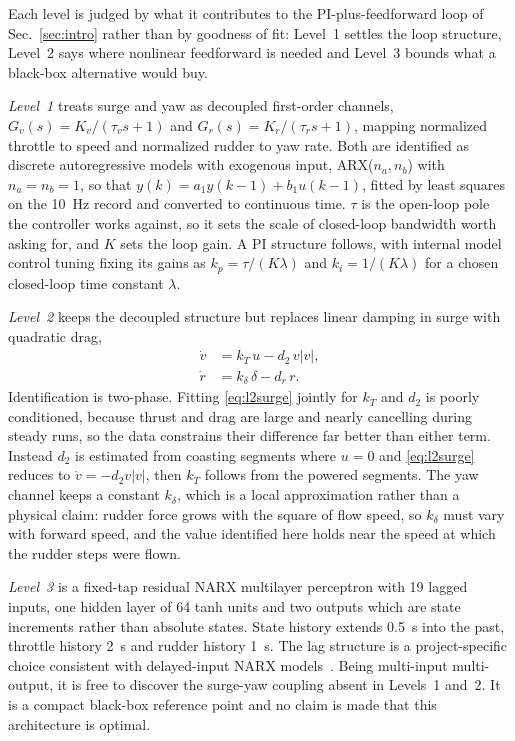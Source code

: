 \documentclass[conference]{IEEEtran}
\begin{document}
Each level is judged by what it contributes to the PI-plus-feedforward loop of Sec.~\ref{sec:intro} rather than by goodness of fit: Level~1 settles the loop structure, Level~2 says where nonlinear feedforward is needed and Level~3 bounds what a black-box alternative would buy.

\emph{Level~1} treats surge and yaw as decoupled first-order channels, $G_v(s)=K_v/(\tau_v s+1)$ and $G_r(s)=K_r/(\tau_r s+1)$, mapping normalized throttle to speed and normalized rudder to yaw rate. Both are identified as discrete autoregressive models with exogenous input, ARX($n_a,n_b$) with $n_a=n_b=1$, so that $y(k)=a_1y(k-1)+b_1u(k-1)$, fitted by least squares on the 10~Hz record and converted to continuous time. $\tau$ is the open-loop pole the controller works against, so it sets the scale of closed-loop bandwidth worth asking for, and $K$ sets the loop gain. A PI structure follows, with internal model control tuning fixing its gains as $k_p=\tau/(K\lambda)$ and $k_i=1/(K\lambda)$ for a chosen closed-loop time constant $\lambda$.

\emph{Level~2} keeps the decoupled structure but replaces linear damping in surge with quadratic drag,
\begin{align}
\dot v &= k_T\,u - d_2\,v|v|, \label{eq:l2surge}\\
\dot r &= k_\delta\,\delta - d_r\,r. \label{eq:l2yaw}
\end{align}
Identification is two-phase. Fitting \eqref{eq:l2surge} jointly for $k_T$ and $d_2$ is poorly conditioned, because thrust and drag are large and nearly cancelling during steady runs, so the data constrains their difference far better than either term. Instead $d_2$ is estimated from coasting segments where $u=0$ and \eqref{eq:l2surge} reduces to $\dot v=-d_2v|v|$, then $k_T$ follows from the powered segments. The yaw channel keeps a constant $k_\delta$, which is a local approximation rather than a physical claim: rudder force grows with the square of flow speed, so $k_\delta$ must vary with forward speed, and the value identified here holds near the speed at which the rudder steps were flown.

\emph{Level~3} is a fixed-tap residual NARX multilayer perceptron with 19 lagged inputs, one hidden layer of 64 tanh units and two outputs which are state increments rather than absolute states. State history extends 0.5~s into the past, throttle history 2~s and rudder history 1~s. The lag structure is a project-specific choice consistent with delayed-input NARX models~\cite{lin1997delay}. Being multi-input multi-output, it is free to discover the surge-yaw coupling absent in Levels~1 and~2. It is a compact black-box reference point and no claim is made that this architecture is optimal.
\end{document}
